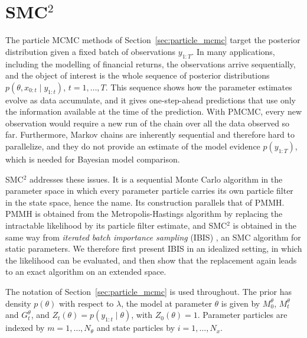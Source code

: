 \section{SMC$^2$}
\label{sec:smc2}
The particle MCMC methods of Section~\ref{sec:particle_mcmc} target the posterior distribution given a fixed batch of observations $y_{1:T}$. In many applications, including the modelling of financial returns, the observations arrive sequentially, and the object of interest is the whole sequence of posterior distributions $p(\theta,x_{0:t}\mid y_{1:t})$, $t=1,\ldots,T$. This sequence shows how the parameter estimates evolve as data accumulate, and it gives one-step-ahead predictions that use only the information available at the time of the prediction. With PMCMC, every new observation would require a new run of the chain over all the data observed so far. Furthermore, Markov chains are inherently sequential and therefore hard to parallelize, and they do not provide an estimate of the model evidence $p(y_{1:T})$, which is needed for Bayesian model comparison.

SMC$^2$ \cite{chopin2013smc2} addresses these issues. It is a sequential Monte Carlo algorithm in the parameter space in which every parameter particle carries its own particle filter in the state space, hence the name. Its construction parallels that of PMMH. PMMH is obtained from the Metropolis-Hastings algorithm by replacing the intractable likelihood by its particle filter estimate, and SMC$^2$ is obtained in the same way from \emph{iterated batch importance sampling} (IBIS) \cite{chopin2002sequential}, an SMC algorithm for static parameters. We therefore first present IBIS in an idealized setting, in which the likelihood can be evaluated, and then show that the replacement again leads to an exact algorithm on an extended space.

The notation of Section~\ref{sec:particle_mcmc} is used throughout. The prior has density $p(\theta)$ with respect to $\lambda$, the model at parameter $\theta$ is given by $M_0^\theta$, $M_t^\theta$ and $G_t^\theta$, and $Z_t(\theta) = p(y_{1:t}\mid\theta)$, with $Z_0(\theta) = 1$. Parameter particles are indexed by $m=1,\ldots,N_\theta$ and state particles by $i=1,\ldots,N_x$.

